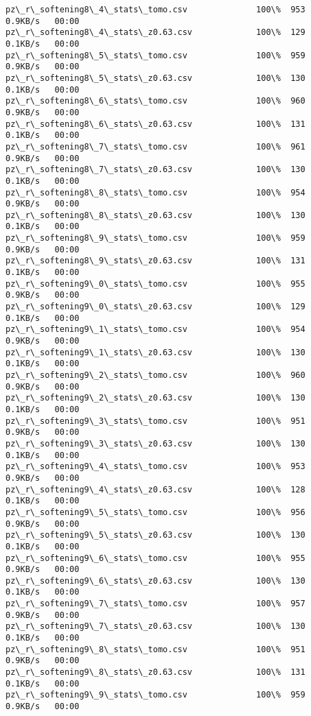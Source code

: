 \documentclass[11pt]{article}
\begin{document}
\begin{Verbatim}[commandchars=\\\{\}]
pz\_r\_softening8\_4\_stats\_tomo.csv              100\%  953     0.9KB/s   00:00    
pz\_r\_softening8\_4\_stats\_z0.63.csv             100\%  129     0.1KB/s   00:00    
pz\_r\_softening8\_5\_stats\_tomo.csv              100\%  959     0.9KB/s   00:00    
pz\_r\_softening8\_5\_stats\_z0.63.csv             100\%  130     0.1KB/s   00:00    
pz\_r\_softening8\_6\_stats\_tomo.csv              100\%  960     0.9KB/s   00:00    
pz\_r\_softening8\_6\_stats\_z0.63.csv             100\%  131     0.1KB/s   00:00    
pz\_r\_softening8\_7\_stats\_tomo.csv              100\%  961     0.9KB/s   00:00    
pz\_r\_softening8\_7\_stats\_z0.63.csv             100\%  130     0.1KB/s   00:00    
pz\_r\_softening8\_8\_stats\_tomo.csv              100\%  954     0.9KB/s   00:00    
pz\_r\_softening8\_8\_stats\_z0.63.csv             100\%  130     0.1KB/s   00:00    
pz\_r\_softening8\_9\_stats\_tomo.csv              100\%  959     0.9KB/s   00:00    
pz\_r\_softening8\_9\_stats\_z0.63.csv             100\%  131     0.1KB/s   00:00    
pz\_r\_softening9\_0\_stats\_tomo.csv              100\%  955     0.9KB/s   00:00    
pz\_r\_softening9\_0\_stats\_z0.63.csv             100\%  129     0.1KB/s   00:00    
pz\_r\_softening9\_1\_stats\_tomo.csv              100\%  954     0.9KB/s   00:00    
pz\_r\_softening9\_1\_stats\_z0.63.csv             100\%  130     0.1KB/s   00:00    
pz\_r\_softening9\_2\_stats\_tomo.csv              100\%  960     0.9KB/s   00:00    
pz\_r\_softening9\_2\_stats\_z0.63.csv             100\%  130     0.1KB/s   00:00    
pz\_r\_softening9\_3\_stats\_tomo.csv              100\%  951     0.9KB/s   00:00    
pz\_r\_softening9\_3\_stats\_z0.63.csv             100\%  130     0.1KB/s   00:00    
pz\_r\_softening9\_4\_stats\_tomo.csv              100\%  953     0.9KB/s   00:00    
pz\_r\_softening9\_4\_stats\_z0.63.csv             100\%  128     0.1KB/s   00:00    
pz\_r\_softening9\_5\_stats\_tomo.csv              100\%  956     0.9KB/s   00:00    
pz\_r\_softening9\_5\_stats\_z0.63.csv             100\%  130     0.1KB/s   00:00    
pz\_r\_softening9\_6\_stats\_tomo.csv              100\%  955     0.9KB/s   00:00    
pz\_r\_softening9\_6\_stats\_z0.63.csv             100\%  130     0.1KB/s   00:00    
pz\_r\_softening9\_7\_stats\_tomo.csv              100\%  957     0.9KB/s   00:00    
pz\_r\_softening9\_7\_stats\_z0.63.csv             100\%  130     0.1KB/s   00:00    
pz\_r\_softening9\_8\_stats\_tomo.csv              100\%  951     0.9KB/s   00:00    
pz\_r\_softening9\_8\_stats\_z0.63.csv             100\%  131     0.1KB/s   00:00    
pz\_r\_softening9\_9\_stats\_tomo.csv              100\%  959     0.9KB/s   00:00    

\end{Verbatim}
\end{document}
